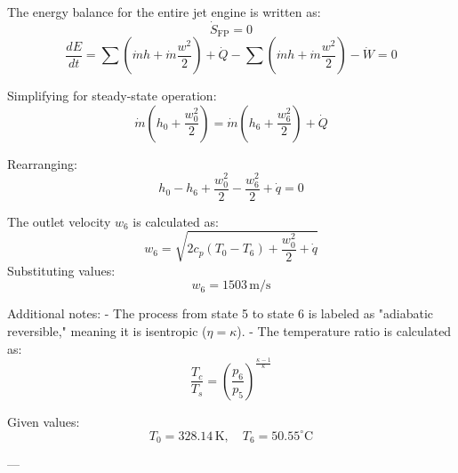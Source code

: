 The energy balance for the entire jet engine is written as:  
\[
\dot{S}_{\text{FP}} = 0  
\]  
\[
\frac{dE}{dt} = \sum (\dot{m} h + \dot{m} \frac{w^2}{2}) + \dot{Q} - \sum (\dot{m} h + \dot{m} \frac{w^2}{2}) - \dot{W} = 0  
\]  

Simplifying for steady-state operation:  
\[
\dot{m} \left( h_0 + \frac{w_0^2}{2} \right) = \dot{m} \left( h_6 + \frac{w_6^2}{2} \right) + \dot{Q}  
\]  

Rearranging:  
\[
h_0 - h_6 + \frac{w_0^2}{2} - \frac{w_6^2}{2} + \dot{q} = 0  
\]  

The outlet velocity \( w_6 \) is calculated as:  
\[
w_6 = \sqrt{2 c_p (T_0 - T_6) + \frac{w_0^2}{2} + \dot{q}}  
\]  
Substituting values:  
\[
w_6 = 1503 \, \text{m/s}  
\]  

Additional notes:  
- The process from state 5 to state 6 is labeled as "adiabatic reversible," meaning it is isentropic (\( \eta = \kappa \)).  
- The temperature ratio is calculated as:  
\[
\frac{T_c}{T_s} = \left( \frac{p_6}{p_5} \right)^{\frac{\kappa - 1}{\kappa}}  
\]  

Given values:  
\[
T_0 = 328.14 \, \text{K}, \quad T_6 = 50.55^\circ \text{C}  
\]  

---